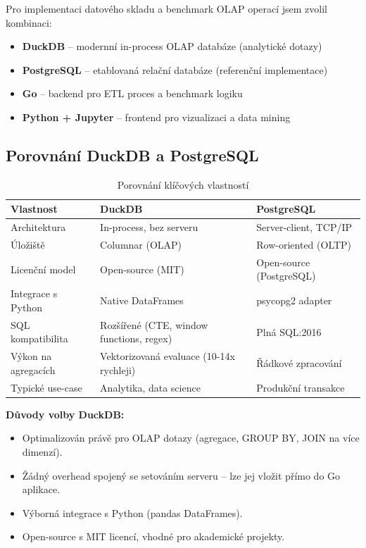 \documentclass[12pt,a4paper]{article}
\begin{document}
Pro implementaci datového skladu a benchmark OLAP operací jsem zvolil kombinaci:
\begin{itemize}
    \item \textbf{DuckDB} – modernní in-process OLAP databáze (analytické dotazy)
    \item \textbf{PostgreSQL} – etablovaná relační databáze (referenční implementace)
    \item \textbf{Go} – backend pro ETL proces a benchmark logiku
    \item \textbf{Python + Jupyter} – frontend pro vizualizaci a data mining
\end{itemize}

\subsection{Porovnání DuckDB a PostgreSQL}

\begin{table}[H]
    \centering
    \caption{Porovnání klíčových vlastností}
    \begin{tabularx}{\textwidth}{|X|X|X|}
        \hline
        \textbf{Vlastnost} & \textbf{DuckDB} & \textbf{PostgreSQL} \\
        \hline
        Architektura & In-process, bez serveru & Server-client, TCP/IP \\
        \hline
        Úložiště & Columnar (OLAP) & Row-oriented (OLTP) \\
        \hline
        Licenční model & Open-source (MIT) & Open-source (PostgreSQL) \\
        \hline
        Integrace s Python & Native DataFrames & psycopg2 adapter \\
        \hline
        SQL kompatibilita & Rozšířené (CTE, window functions, regex) & Plná SQL:2016 \\
        \hline
        Výkon na agregacích & Vektorizovaná evaluace (10-14x rychleji) & Řádkové zpracování \\
        \hline
        Typické use-case & Analytika, data science & Produkční transakce \\
        \hline
    \end{tabularx}
\end{table}

\textbf{Důvody volby DuckDB:}
\begin{itemize}
    \item Optimalizován právě pro OLAP dotazy (agregace, GROUP BY, JOIN na více dimenzí).
    \item Žádný overhead spojený se setováním serveru – lze jej vložit přímo do Go aplikace.
    \item Výborná integrace s Python (pandas DataFrames).
    \item Open-source s MIT licencí, vhodné pro akademické projekty.
\end{itemize}
\end{document}
